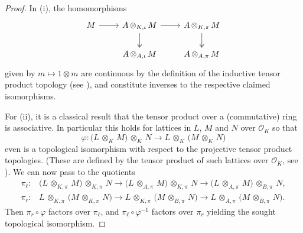 \documentclass[a4paper, reqno, 10pt]{amsart}
\theoremstyle{definition}
\numberwithin{equation}{section}
\newcommand{\botimes}[1]{{\,\otimes_{#1}\,}}
\newcommand{\indotimes}{{\,\otimes_{K,\iota}\,}}
\newcommand{\lra}{\longrightarrow}
\newcommand{\mto}{\mapsto}
\newcommand{\projotimes}{{\,\otimes_{K,\pi}\,}}
\newcommand{\CO}{{\mathcal {O}}}
\begin{document}
\begin{proof}
	In (i), the homomorphisms
	\begin{equation*}
		\begin{tikzcd}
			M \ar[r] & A \indotimes M \ar[d, two heads] \ar[r] & A \projotimes M \ar[d, two heads] \\
			& A \botimes{A,\iota} M  & A \botimes{A,\pi} M 
		\end{tikzcd}
	\end{equation*}
	given by $m \mto 1 \otimes m$ are continuous by the definition of the inductive tensor product topology (see \cite[\S 17 A.]{Schneider02NonArchFunctAna}), and constitute inverses to the respective claimed isomorphisms.
	
	
	For (ii), it is a classical result that the tensor product over a (commutative) ring is associative.
	In particular this holds for lattices in $L$, $M$ and $N$ over $\CO_K$ so that 
	\begin{equation*}
		\varphi \colon \big( L \botimes{K} M \big) \botimes{K} N \lra L \botimes{K} \big( M \botimes{K} N \big) 
	\end{equation*}
	even is a topological isomorphism with respect to the projective tensor product topologies.
	(These are defined by the tensor product of such lattices over $\CO_K$, see \cite[\S 17 B.]{Schneider02NonArchFunctAna}).
	We can now pass to the quotients
	\begin{align*}\label{Eq 1 - Quotient map of tensor products 1}
		\pi_\ell \colon &\big(L \botimes{K,\pi} M \big) \botimes{K,\pi} N \lra \big(L \botimes{A,\pi} M \big)\botimes{K,\pi} N  \lra \big(L \botimes{A,\pi}  M \big)\botimes{B,\pi} N  , \\
		\pi_r \colon &L \botimes{K,\pi} \big(M \botimes{K,\pi} N \big) \lra L \botimes{K,\pi} \big(M \botimes{B,\pi} N \big) \lra L \botimes{A,\pi} \big( M \botimes{B,\pi} N \big) .
	\end{align*}
	Then $\pi_r \circ \varphi$ factors over $\pi_\ell$, and $\pi_\ell \circ \varphi^{-1} $ factors over $\pi_r$ yielding the sought topological isomorphism.
	

\end{proof}
\end{document}
